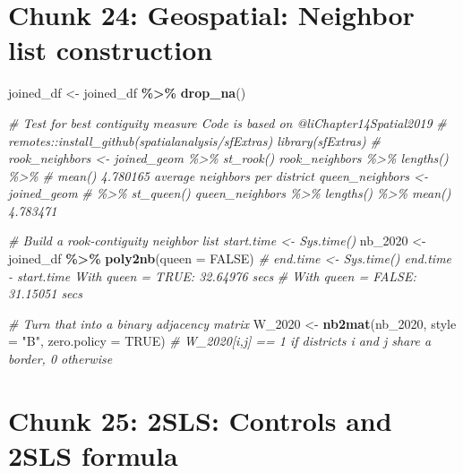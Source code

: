 \documentclass[
]{article}
\newenvironment{Shaded}{\begin{snugshade}}{\end{snugshade}}
\newcommand{\AttributeTok}[1]{\textcolor[rgb]{0.13,0.29,0.53}{#1}}
\newcommand{\CommentTok}[1]{\textcolor[rgb]{0.56,0.35,0.01}{\textit{#1}}}
\newcommand{\ConstantTok}[1]{\textcolor[rgb]{0.56,0.35,0.01}{#1}}
\newcommand{\FunctionTok}[1]{\textcolor[rgb]{0.13,0.29,0.53}{\textbf{#1}}}
\newcommand{\NormalTok}[1]{#1}
\newcommand{\OtherTok}[1]{\textcolor[rgb]{0.56,0.35,0.01}{#1}}
\newcommand{\SpecialCharTok}[1]{\textcolor[rgb]{0.81,0.36,0.00}{\textbf{#1}}}
\newcommand{\StringTok}[1]{\textcolor[rgb]{0.31,0.60,0.02}{#1}}
\begin{document}
\section*{Chunk 24: Geospatial: Neighbor list construction}\label{chunk-24-geospatial-neighbor-list-construction}

\begin{Shaded}
\begin{Highlighting}[]
\NormalTok{joined\_df }\OtherTok{\textless{}{-}}\NormalTok{ joined\_df }\SpecialCharTok{\%\textgreater{}\%}
    \FunctionTok{drop\_na}\NormalTok{()}

\CommentTok{\# Test for best contiguity measure Code is based on @liChapter14Spatial2019}
\CommentTok{\# remotes::install\_github(\textquotesingle{}spatialanalysis/sfExtras\textquotesingle{}) library(sfExtras)}
\CommentTok{\# rook\_neighbors \textless{}{-} joined\_geom \%\textgreater{}\% st\_rook() rook\_neighbors \%\textgreater{}\% lengths() \%\textgreater{}\%}
\CommentTok{\# mean() 4.780165 average neighbors per district queen\_neighbors \textless{}{-} joined\_geom}
\CommentTok{\# \%\textgreater{}\% st\_queen() queen\_neighbors \%\textgreater{}\% lengths() \%\textgreater{}\% mean() 4.783471}

\CommentTok{\# Build a rook‐contiguity neighbor list start.time \textless{}{-} Sys.time()}
\NormalTok{nb\_2020 }\OtherTok{\textless{}{-}}\NormalTok{ joined\_df }\SpecialCharTok{\%\textgreater{}\%}
    \FunctionTok{poly2nb}\NormalTok{(}\AttributeTok{queen =} \ConstantTok{FALSE}\NormalTok{)}
\CommentTok{\# end.time \textless{}{-} Sys.time() end.time {-} start.time With queen = TRUE: 32.64976 secs}
\CommentTok{\# With queen = FALSE: 31.15051 secs}

\CommentTok{\# Turn that into a binary adjacency matrix}
\NormalTok{W\_2020 }\OtherTok{\textless{}{-}} \FunctionTok{nb2mat}\NormalTok{(nb\_2020, }\AttributeTok{style =} \StringTok{"B"}\NormalTok{, }\AttributeTok{zero.policy =} \ConstantTok{TRUE}\NormalTok{)}
\CommentTok{\# W\_2020[i,j] == 1 if districts i and j share a border, 0 otherwise}
\end{Highlighting}
\end{Shaded}

\section*{Chunk 25: 2SLS: Controls and 2SLS formula}\label{chunk-25-2sls-controls-and-2sls-formula}
\end{document}
